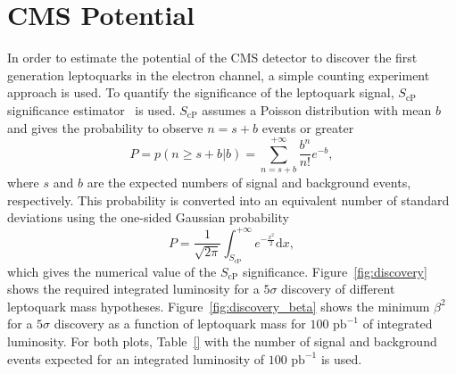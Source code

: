 %

\section{CMS Potential} \label{CMSpotential}


In order to estimate the potential of the CMS detector to discover the first generation leptoquarks
in the electron channel, a simple counting experiment approach is used. To quantify the significance of the
leptoquark signal, $S_\text{cP}$ significance estimator~\cite{ref:scp} is used. $S_\text{cP}$ assumes a Poisson distribution
with mean $b$ and gives the probability to observe $n=s+b$ events or greater
\begin{equation}
P = p(n\geq s+b|b) = \sum_{n=s+b}^{+\infty} \frac{b^n}{n!}e^{-b},
\end{equation}
where $s$ and $b$ are the expected numbers of signal and background events, respectively. This probability is 
converted into an equivalent number of standard deviations using the one-sided Gaussian probability
\begin{equation}
P = \frac{1}{\sqrt{2\pi}}\int_{S_\text{cP}}^{+\infty} e^{-\frac{x^2}{2}}\mathrm{d}x,
\end{equation}
which gives the numerical value of the $S_\text{cP}$ significance. Figure~\ref{fig:discovery} shows the required integrated luminosity
for a $5\sigma$ discovery of different leptoquark mass hypotheses. Figure~\ref{fig:discovery_beta} shows the minimum $\beta^2$ for
a $5\sigma$ discovery as a function of leptoquark mass for $100\text{ pb}^{-1}$ of integrated luminosity.
For both plots, Table~\ref{} with the number of signal and background events expected for an integrated luminosity
of $100\text{ pb}^{-1}$ is used.

